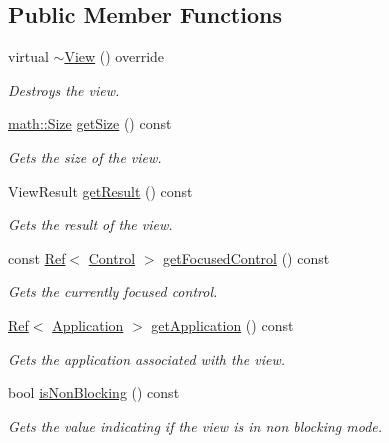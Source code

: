\subsection*{Public Member Functions}
\begin{DoxyCompactItemize}
\item 
virtual \mbox{\hyperlink{class_view_a73446be92068b1fb7a4ccc29445d379f}{$\sim$\+View}} () override
\begin{DoxyCompactList}\small\item\em Destroys the view. \end{DoxyCompactList}\item 
\mbox{\hyperlink{structmath_1_1_size}{math\+::\+Size}} \mbox{\hyperlink{class_view_aa134891eb68e40d94fdd0c074750edcb}{get\+Size}} () const
\begin{DoxyCompactList}\small\item\em Gets the size of the view. \end{DoxyCompactList}\item 
View\+Result \mbox{\hyperlink{class_view_a12b635ae31cb79f1f907e41e41bad74d}{get\+Result}} () const
\begin{DoxyCompactList}\small\item\em Gets the result of the view. \end{DoxyCompactList}\item 
const \mbox{\hyperlink{class_ref}{Ref}}$<$ \mbox{\hyperlink{class_control}{Control}} $>$ \mbox{\hyperlink{class_view_ab5987bd0e07a48ff5f9033c6db76bc1f}{get\+Focused\+Control}} () const
\begin{DoxyCompactList}\small\item\em Gets the currently focused control. \end{DoxyCompactList}\item 
\mbox{\hyperlink{class_ref}{Ref}}$<$ \mbox{\hyperlink{class_application}{Application}} $>$ \mbox{\hyperlink{class_view_ad902fbd5ece1dd9e02e05ce473f90712}{get\+Application}} () const
\begin{DoxyCompactList}\small\item\em Gets the application associated with the view. \end{DoxyCompactList}\item 
bool \mbox{\hyperlink{class_view_afd9ac571a451efbab5ffa0a04bbef450}{is\+Non\+Blocking}} () const
\begin{DoxyCompactList}\small\item\em Gets the value indicating if the view is in non blocking mode. \end{DoxyCompactList}\item 

\end{DoxyCompactItemize}

